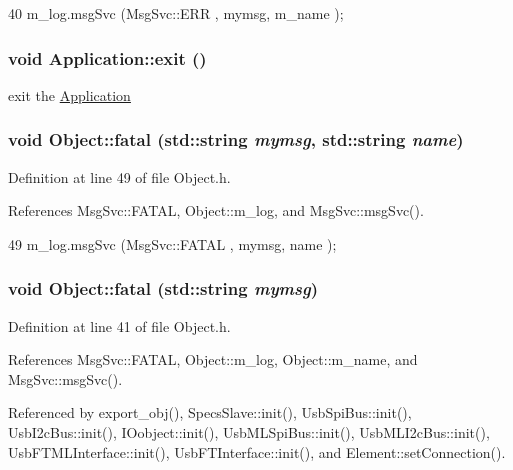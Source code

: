 \begin{DoxyCode}
40 { m_log.msgSvc (MsgSvc::ERR     , mymsg, m_name ); }
\end{DoxyCode}
\hypertarget{classApplication_a3c8a98d6c10a5b054800488df16cdbcb}{
\subsubsection[{exit}]{\setlength{\rightskip}{0pt plus 5cm}void Application::exit ()}}
\label{classApplication_a3c8a98d6c10a5b054800488df16cdbcb}
exit the \hyperlink{classApplication}{Application} \hypertarget{classObject_ae62acd3d09f716220f75f252dc38bc9a}{
\subsubsection[{fatal}]{\setlength{\rightskip}{0pt plus 5cm}void Object::fatal (std::string {\em mymsg}, \/  std::string {\em name})}}
\label{classObject_ae62acd3d09f716220f75f252dc38bc9a}


Definition at line 49 of file Object.h.

References MsgSvc::FATAL, Object::m\_\-log, and MsgSvc::msgSvc().


\begin{DoxyCode}
49 { m_log.msgSvc (MsgSvc::FATAL   , mymsg, name ); }
\end{DoxyCode}
\hypertarget{classObject_aad5a16aac7516ce65bd5ec02ab07fc80}{
\subsubsection[{fatal}]{\setlength{\rightskip}{0pt plus 5cm}void Object::fatal (std::string {\em mymsg})}}
\label{classObject_aad5a16aac7516ce65bd5ec02ab07fc80}


Definition at line 41 of file Object.h.

References MsgSvc::FATAL, Object::m\_\-log, Object::m\_\-name, and MsgSvc::msgSvc().

Referenced by export\_\-obj(), SpecsSlave::init(), UsbSpiBus::init(), UsbI2cBus::init(), IOobject::init(), UsbMLSpiBus::init(), UsbMLI2cBus::init(), UsbFTMLInterface::init(), UsbFTInterface::init(), and Element::setConnection().


